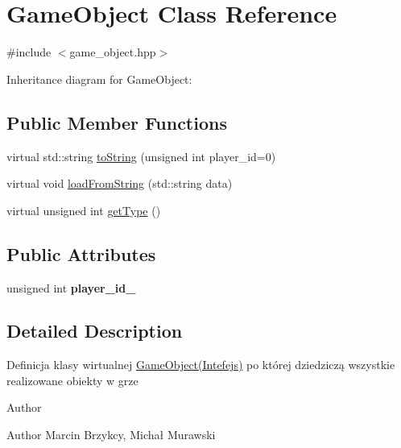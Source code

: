 \hypertarget{classGameObject}{}\section{Game\+Object Class Reference}
\label{classGameObject}


{\ttfamily \#include $<$game\+\_\+object.\+hpp$>$}



Inheritance diagram for Game\+Object\+:
\subsection*{Public Member Functions}
\begin{DoxyCompactItemize}
\item 
virtual std\+::string \hyperlink{classGameObject_aabe25448b728506ce27e975d07217858}{to\+String} (unsigned int player\+\_\+id=0)
\item 
virtual void \hyperlink{classGameObject_a85a98216580e583e15477cd9178fa6e7}{load\+From\+String} (std\+::string data)
\item 
virtual unsigned int \hyperlink{classGameObject_a96c0dc16e310d0a26a1c8b05ab3d139f}{get\+Type} ()
\end{DoxyCompactItemize}
\subsection*{Public Attributes}
\begin{DoxyCompactItemize}
\item 
unsigned int {\bfseries player\+\_\+id\+\_\+}\hypertarget{classGameObject_a950303b3e85ba6afa09c188bca96c7c5}{}\label{classGameObject_a950303b3e85ba6afa09c188bca96c7c5}

\end{DoxyCompactItemize}


\subsection{Detailed Description}
Definicja klasy wirtualnej \hyperlink{classGameObject}{Game\+Object(\+Intefejs)} po której dziedziczą wszystkie realizowane obiekty w grze \begin{DoxyAuthor}{Author}

\end{DoxyAuthor}
\begin{DoxyParagraph}{Author}
Marcin Brzykcy, Michał Murawski 
\end{DoxyParagraph}


